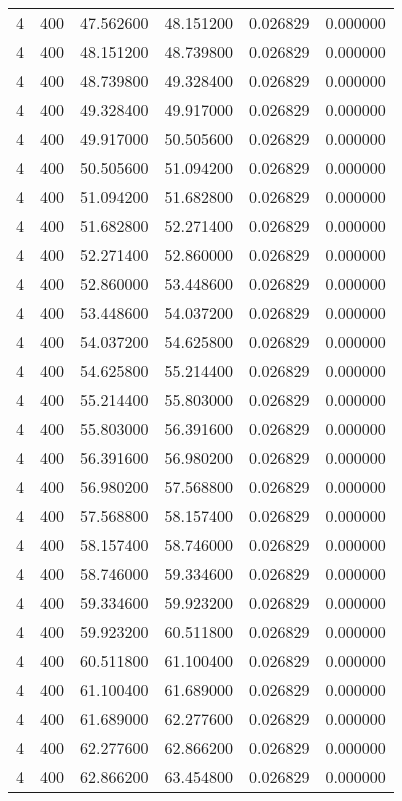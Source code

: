 \begin{longtable}{rrrrrr}
4 & 400 & 47.562600 & 48.151200 & 0.026829 & 0.000000 \\
4 & 400 & 48.151200 & 48.739800 & 0.026829 & 0.000000 \\
4 & 400 & 48.739800 & 49.328400 & 0.026829 & 0.000000 \\
4 & 400 & 49.328400 & 49.917000 & 0.026829 & 0.000000 \\
4 & 400 & 49.917000 & 50.505600 & 0.026829 & 0.000000 \\
4 & 400 & 50.505600 & 51.094200 & 0.026829 & 0.000000 \\
4 & 400 & 51.094200 & 51.682800 & 0.026829 & 0.000000 \\
4 & 400 & 51.682800 & 52.271400 & 0.026829 & 0.000000 \\
4 & 400 & 52.271400 & 52.860000 & 0.026829 & 0.000000 \\
4 & 400 & 52.860000 & 53.448600 & 0.026829 & 0.000000 \\
4 & 400 & 53.448600 & 54.037200 & 0.026829 & 0.000000 \\
4 & 400 & 54.037200 & 54.625800 & 0.026829 & 0.000000 \\
4 & 400 & 54.625800 & 55.214400 & 0.026829 & 0.000000 \\
4 & 400 & 55.214400 & 55.803000 & 0.026829 & 0.000000 \\
4 & 400 & 55.803000 & 56.391600 & 0.026829 & 0.000000 \\
4 & 400 & 56.391600 & 56.980200 & 0.026829 & 0.000000 \\
4 & 400 & 56.980200 & 57.568800 & 0.026829 & 0.000000 \\
4 & 400 & 57.568800 & 58.157400 & 0.026829 & 0.000000 \\
4 & 400 & 58.157400 & 58.746000 & 0.026829 & 0.000000 \\
4 & 400 & 58.746000 & 59.334600 & 0.026829 & 0.000000 \\
4 & 400 & 59.334600 & 59.923200 & 0.026829 & 0.000000 \\
4 & 400 & 59.923200 & 60.511800 & 0.026829 & 0.000000 \\
4 & 400 & 60.511800 & 61.100400 & 0.026829 & 0.000000 \\
4 & 400 & 61.100400 & 61.689000 & 0.026829 & 0.000000 \\
4 & 400 & 61.689000 & 62.277600 & 0.026829 & 0.000000 \\
4 & 400 & 62.277600 & 62.866200 & 0.026829 & 0.000000 \\
4 & 400 & 62.866200 & 63.454800 & 0.026829 & 0.000000 \\

\end{longtable}
